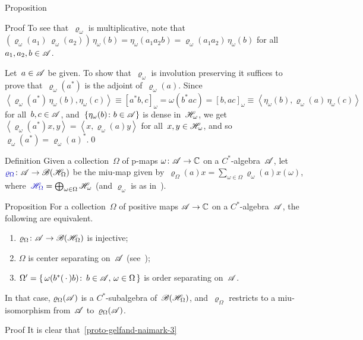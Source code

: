 \documentclass[a]{subfiles}
\begin{document}
\begin{parsec}
\begin{point}{Proposition}
\begin{point}{Proof}
To see that~$\varrho_\omega$ is multiplicative,
note that
$(\varrho_\omega(a_1)\,\varrho_\omega(a_2))\,\eta_\omega(b)
= \eta_\omega(a_1a_2b)=\varrho_\omega(a_1a_2)\,\eta_\omega(b)$
for all~$a_1,a_2,b\in\mathscr{A}$.

Let~$a\in\mathscr{A}$ be given.
To show that~$\varrho_\omega$ is involution preserving
it suffices to prove that~$\varrho_\omega(a^*)$
is the adjoint of~$\varrho_\omega(a)$.
Since~$\left<\varrho_\omega(a^*)\,\eta_\omega(b),\eta_\omega(c)\right>
\equiv [a^*b,c]_\omega = \omega(b^*ac)=[b,ac]_\omega
\equiv \left<\eta_\omega(b),\varrho_\omega(a)\,\eta_\omega(c)\right>$
for all~$b,c\in\mathscr{A}$,
and~$\{\eta_\omega(b)\colon b\in\mathscr{A}\}$
is dense in~$\mathscr{H}_\omega$,
we get~$\left<\varrho_\omega(a^*)x,y\right>=\left<x,\varrho_\omega(a)y\right>$
for all~$x,y\in\mathscr{H}_\omega$,
and so~$\varrho_\omega(a^*)=\varrho_\omega(a)^*$.\qed
\end{point}
\end{point}
\begin{point}{Definition}%
Given a collection~$\Omega$ of p-maps $\omega\colon \mathscr{A}\to\mathbb{C}$
on a $C^*$-algebra~$\mathscr{A}$,
let $\Define{\varrho_\Omega}\colon \scrA\to \scrB(\scrH_\Omega)$%
be the miu-map given by~$\varrho_\Omega(a)x 
= \sum_{\omega\in\Omega} \varrho_\omega(a)x(\omega)$,
where~$\Define{\scrH_\Omega}=\bigoplus_{\omega\in\Omega}\scrH_\omega$%
(and $\varrho_\omega$ is as in~).
\end{point}
\begin{point}{Proposition}%
For a collection~$\Omega$ of positive maps $\mathscr{A}\to \mathbb{C}$
on a $C^*$-algebra~$\mathscr{A}$,
the following are equivalent.
\begin{enumerate}
\item
\label{proto-gelfand-naimark-1}
$\varrho_\Omega\colon \mathscr{A}\to\mathscr{B}(\mathscr{H}_\Omega)$
is injective;
\item
\label{proto-gelfand-naimark-2}
$\Omega$ is center separating on~$\mathscr{A}$
(see~);
\item
\label{proto-gelfand-naimark-3}
$\Omega'=\{\,\omega(b^*(\,\cdot\,)b)\colon \, b\in\mathscr{A},\,\omega\in\Omega\,\}$
is order separating on~$\mathscr{A}$.
\end{enumerate}
In that case, $\varrho_\Omega(\mathscr{A})$ is a $C^*$-subalgebra
of~$\mathscr{B}(\mathscr{H}_\Omega)$,
and~$\varrho_\Omega$
restricts to a miu-isomorphism from~$\mathscr{A}$ to~$\varrho_\Omega(\mathscr{A})$.
\begin{point}{Proof}%
It is clear that~\ref{proto-gelfand-naimark-3}

\end{point}
\end{point}
\end{parsec}
\end{document}

